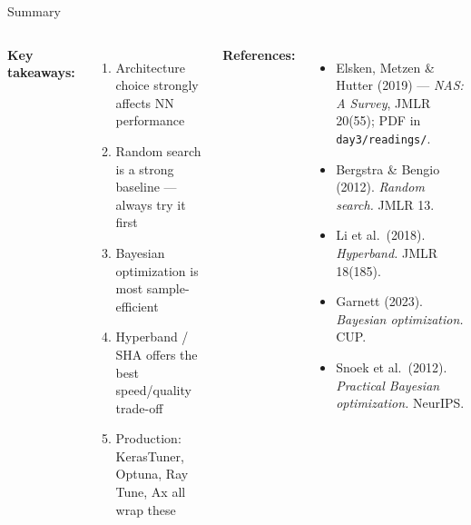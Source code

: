 \documentclass[aspectratio=169,11pt]{beamer}
\newcommand{\emphc}[1]{\textcolor{harvardcrimson}{#1}}
\begin{document}
\begin{frame}{Summary}
\begin{columns}[T]
\textbf{Key takeaways:}
\begin{enumerate}
    \item Architecture choice \emphc{strongly} affects NN performance
    \item Random search is a strong baseline --- always try it first
    \item Bayesian optimization is most sample-efficient
    \item Hyperband / SHA offers the best speed/quality trade-off
    \item Production: KerasTuner, Optuna, Ray Tune, Ax all wrap these
\end{enumerate}

\textbf{References:}
{\scriptsize
\begin{itemize}\itemsep0pt
    \item \emphc{Elsken, Metzen \& Hutter (2019)} --- \emph{NAS: A Survey}, JMLR 20(55); PDF in \texttt{day3/readings/}.
    \item Bergstra \& Bengio (2012). \emph{Random search.} JMLR 13.
    \item Li et al.\ (2018). \emph{Hyperband.} JMLR 18(185).
    \item Garnett (2023). \emph{Bayesian optimization.} CUP.
    \item Snoek et al.\ (2012). \emph{Practical Bayesian optimization.} NeurIPS.
\end{itemize}
}
\end{columns}

\end{frame}
\end{document}
